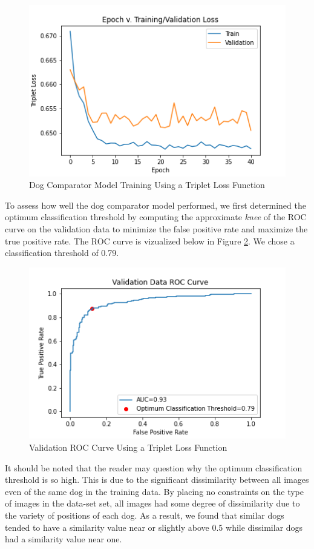 \documentclass{article}
\begin{document}
\begin{figure}[h]
\centering
	\includegraphics[scale=0.7]{final-report-images/triplet_training.png}
\caption{Dog Comparator Model Training Using a Triplet Loss Function}
\label{fig:x epoch_v_loss}
\end{figure}
To assess how well the dog comparator model performed, we first determined the optimum classification threshold by computing the approximate \emph{knee} of the ROC curve on the validation data to minimize the false positive rate and maximize the true positive rate.  The ROC curve is vizualized below in Figure \ref{fig:x val roc curve}.  We chose a classification threshold of 0.79.

\begin{figure}[h]
\centering
	\includegraphics[scale=0.7]{final-report-images/roc_curve_validation_triplet.png}
\caption{Validation ROC Curve Using a Triplet Loss Function}
\label{fig:x val roc curve}
\end{figure}

\noindent It should be noted that the reader may question why the optimum classification threshold is so high.  This is due to the significant dissimilarity between all images even of the same dog in the training data.  By placing no constraints on the type of images in the data-set set, all images had some degree of dissimilarity due to the variety of positions of each dog.  As a result, we found that similar dogs tended to have a similarity value near or slightly above 0.5 while dissimilar dogs had a similarity value near one.  
\end{document}
